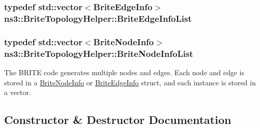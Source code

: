 \subsubsection[{\texorpdfstring{Brite\+Edge\+Info\+List}{BriteEdgeInfoList}}]{\setlength{\rightskip}{0pt plus 5cm}typedef std\+::vector$<${\bf Brite\+Edge\+Info}$>$ {\bf ns3\+::\+Brite\+Topology\+Helper\+::\+Brite\+Edge\+Info\+List}\hspace{0.3cm}{\ttfamily [private]}}\hypertarget{classns3_1_1BriteTopologyHelper_aa5320918091f27883e0d106f00c5b8ef}{}\label{classns3_1_1BriteTopologyHelper_aa5320918091f27883e0d106f00c5b8ef}
\subsubsection[{\texorpdfstring{Brite\+Node\+Info\+List}{BriteNodeInfoList}}]{\setlength{\rightskip}{0pt plus 5cm}typedef std\+::vector$<${\bf Brite\+Node\+Info}$>$ {\bf ns3\+::\+Brite\+Topology\+Helper\+::\+Brite\+Node\+Info\+List}\hspace{0.3cm}{\ttfamily [private]}}\hypertarget{classns3_1_1BriteTopologyHelper_a92cab5d8859b5f4682b8aff38a6959c7}{}\label{classns3_1_1BriteTopologyHelper_a92cab5d8859b5f4682b8aff38a6959c7}
The B\+R\+I\+TE code generates multiple nodes and edges. Each node and edge is stored in a \hyperlink{structns3_1_1BriteTopologyHelper_1_1BriteNodeInfo}{Brite\+Node\+Info} or \hyperlink{structns3_1_1BriteTopologyHelper_1_1BriteEdgeInfo}{Brite\+Edge\+Info} struct, and each instance is stored in a vector. 

\subsection{Constructor \& Destructor Documentation}
